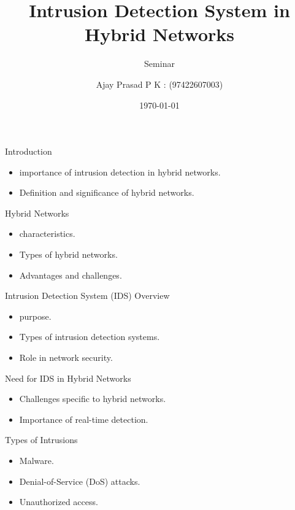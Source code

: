 \documentclass{beamer}
\title{Intrusion Detection System in Hybrid Networks}
\subtitle{Seminar}
\author{Ajay Prasad P K : (97422607003) }
\date{\today}
\begin{document}
\frame{\titlepage}

\begin{frame}{Introduction}
    \begin{itemize}
        \item importance of intrusion detection in hybrid networks.
        \item Definition and significance of hybrid networks.
    \end{itemize}
\end{frame}


\begin{frame}{Hybrid Networks}
    \begin{itemize}
        \item characteristics.
        \item Types of hybrid networks.
        \item Advantages and challenges.
    \end{itemize}
\end{frame}


\begin{frame}{Intrusion Detection System (IDS) Overview}
    \begin{itemize}
        \item purpose.
        \item Types of intrusion detection systems.
        \item Role in network security.
    \end{itemize}
\end{frame}


\begin{frame}{Need for IDS in Hybrid Networks}
    \begin{itemize}
        \item Challenges specific to hybrid networks.
        \item Importance of real-time detection.
    \end{itemize}
\end{frame}

\begin{frame}{Types of Intrusions}
    \begin{itemize}
        \item Malware.
        \item Denial-of-Service (DoS) attacks.
        \item Unauthorized access.
    \end{itemize}
\end{frame}
\end{document}
